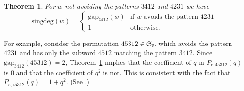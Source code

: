 \documentclass[12pt]{amsart}
\newtheorem{thm}{Theorem}[section]
\newtheorem{cor}[thm]{Corollary}
\theoremstyle{definition}
\numberwithin{equation}{section}
\newcommand{\mfs}[1]{\mathfrak{S}_{#1}}
\newcommand{\pgap}{\mathrm{gap_{3412}}}
\newcommand{\singdeg}{\mathrm{singdeg}}
\newcommand{\avoidingp}{avoiding the patterns $3412$ and $4231${}}
\begin{document}
\begin{thm}\label{t:GaetzGao}
    For $w$ not \avoidingp{}
    we have
    \begin{equation*}
        \singdeg(w) = \begin{cases}
            \pgap(w) &\text{if $w$ avoids the pattern $4231$},\\
            1 &\text{otherwise}.
        \end{cases}
    \end{equation*}
\end{thm}


For example, consider the permutation $45312 \in \mfs 5$, %
which 
avoids the pattern $4231$ and has
only the subword $4512$ matching the pattern $3412$. Since $\pgap(45312)=2$, Theorem~\ref{t:GaetzGao} implies that the coefficient of $q$ in $P_{e,45312}(q)$ is $0$ and that the coefficient of $q^2$ is not.
This is consistent with the fact that $P_{e,45312}(q) = 1+q^2$. (See \cite[p.\,75]{BilleyLak}.)
\end{document}
